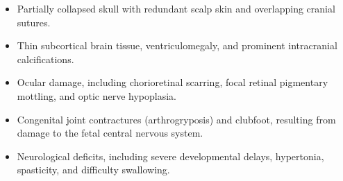 \begin{itemize}
\begin{itemize}
  \item Partially collapsed skull with redundant scalp skin and overlapping cranial sutures.
  \item Thin subcortical brain tissue, ventriculomegaly, and prominent intracranial calcifications.
  \item Ocular damage, including chorioretinal scarring, focal retinal pigmentary mottling, and optic nerve hypoplasia.
  \item Congenital joint contractures (arthrogryposis) and clubfoot, resulting from damage to the fetal central nervous system.
  \item Neurological deficits, including severe developmental delays, hypertonia, spasticity, and difficulty swallowing.
  \end{itemize}
\end{itemize}

